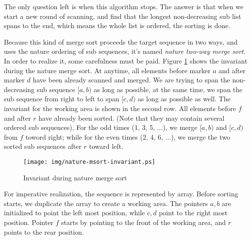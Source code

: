 \documentclass[UTF8]{article}
\begin{document}
The only question left is when this algorithm stops. The answer is that when we start
a new round of scanning, and find that the longest non-decreasing sub list spans to the
end, which means the whole list is ordered, the sorting is done.

Because this kind of merge sort proceeds the target sequence in two ways, and uses the
nature ordering of sub sequences, it's named {\em nature two-way merge sort}. In order
to realize it, some carefulness must be paid. Figure \ref{fig:nature-msort-invariant}
shows the invariant during the nature merge sort. At anytime, all elements before marker
$a$ and after marker $d$ have been already scanned and merged. We are trying to
span the non-decreasing sub sequence $[a, b)$ as long as possible, at the same time,
we span the sub sequence from right to left to span $[c, d)$ as long as possible as well.
The invariant for the working area is shown in the second row. All elements before
$f$ and after $r$ have already been sorted. (Note that they may contain several
ordered sub sequences), For the odd times (1, 3, 5, ...), we merge $[a, b)$ and $[c, d)$
from $f$ toword right; while for the even times (2, 4, 6, ...), we merge the two
sorted sub sequences after $r$ toward left.

\begin{figure}[htbp]
 \centering
 \texttt{[image: img/nature-msort-invariant.ps]}
 \caption{Invariant during nature merge sort}
 \label{fig:nature-msort-invariant}
\end{figure}

For imperative realization, the sequence is represented by array. Before sorting starts,
we duplicate the array to create a working area. The pointers $a, b$ are initialized to
point the left most position, while $c, d$ point to the right most position. Pointer $f$
starts by pointing to the front of the working area, and $r$ points to the rear
position.
\end{document}
